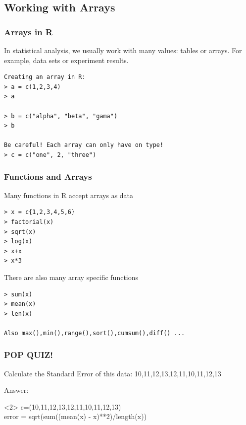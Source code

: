 \documentclass[10pt]{beamer}
\begin{document}
\subsection{Working with Arrays}

\begin{frame}
  \frametitle{Arrays in R}
  \begin{block}{}
    In statistical analysis, we usually work with many values: tables
    or arrays. For example, data sets or experiment results.
  \end{block}
  \bigskip

\begin{verbatim}
Creating an array in R:
> a = c(1,2,3,4)
> a

> b = c("alpha", "beta", "gama")
> b

Be careful! Each array can only have on type!
> c = c("one", 2, "three")
\end{verbatim}
\end{frame}

\begin{frame}
  \frametitle{Functions and Arrays}
  \begin{block}{Many functions in R accept arrays as data}
\begin{verbatim}
> x = c{1,2,3,4,5,6}
> factorial(x)
> sqrt(x)
> log(x)
> x+x
> x*3
\end{verbatim}
  \end{block}

  \begin{block}{There are also many array specific functions}
\begin{verbatim}
> sum(x)
> mean(x)
> len(x)

Also max(),min(),range(),sort(),cumsum(),diff() ...
\end{verbatim}
  \end{block}
\medskip
\end{frame}

\begin{frame}
  \frametitle{POP QUIZ!}

  \begin{block}{Calculate the Standard Error of this data:}
    10,11,12,13,12,11,10,11,12,13
  \end{block}
  \medskip

  Answer:
  \smallskip

  \begin{onlyenv}<2>
    c=(10,11,12,13,12,11,10,11,12,13)\\
    error = sqrt(sum((mean(x) - x)**2)/length(x))
  \end{onlyenv}
\end{frame}
\end{document}
